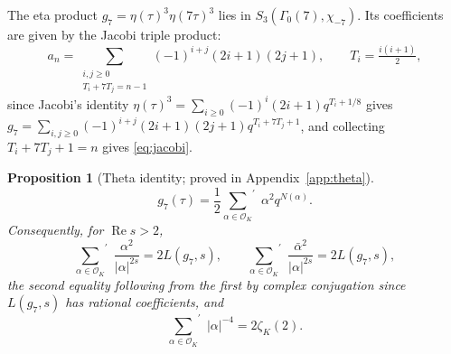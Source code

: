 \documentclass[11pt]{article}
\newtheorem{proposition}[theorem]{Proposition}
\theoremstyle{definition}
\theoremstyle{remark}
\newcommand{\ReT}{\operatorname{Re}}
\newcommand{\OO}{\mathcal{O}}
\begin{document}
The eta product $g_7=\eta(\tau)^3\eta(7\tau)^3$ lies in
$S_3(\Gamma_0(7),\chi_{-7})$. Its coefficients are given by the Jacobi
triple product:
\begin{equation}\label{eq:jacobi}
  a_n=\sum_{\substack{i,j\ge0\\T_i+7T_j=n-1}}(-1)^{i+j}(2i+1)(2j+1),
  \qquad T_i=\tfrac{i(i+1)}2,
\end{equation}
since Jacobi's identity $\eta(\tau)^3=\sum_{i\ge0}(-1)^i(2i+1)q^{T_i+1/8}$
gives $g_7=\sum_{i,j\ge0}(-1)^{i+j}(2i+1)(2j+1)q^{T_i+7T_j+1}$, and
collecting $T_i+7T_j+1=n$ gives \eqref{eq:jacobi}.

\begin{proposition}[Theta identity; proved in Appendix~\ref{app:theta}]\label{prop:theta}
\begin{equation}\label{eq:theta}
  g_7(\tau)=\frac12{\sum_{\alpha\in\OO_K}}^{\!\prime}\;\alpha^2 q^{N(\alpha)}.
\end{equation}
Consequently, for $\ReT s>2$,
\begin{equation}\label{eq:hecke}
  {\sum_{\alpha\in\OO_K}}^{\!\prime}\;\frac{\alpha^2}{|\alpha|^{2s}}=2L(g_7,s),
  \qquad
  {\sum_{\alpha\in\OO_K}}^{\!\prime}\;\frac{\bar\alpha^2}{|\alpha|^{2s}}=2L(g_7,s),
\end{equation}
the second equality following from the first by complex conjugation since
$L(g_7,s)$ has rational coefficients, and
\begin{equation}\label{eq:abs2}
  {\sum_{\alpha\in\OO_K}}^{\!\prime}\;|\alpha|^{-4}=2\zeta_K(2).
\end{equation}
\end{proposition}
\end{document}
